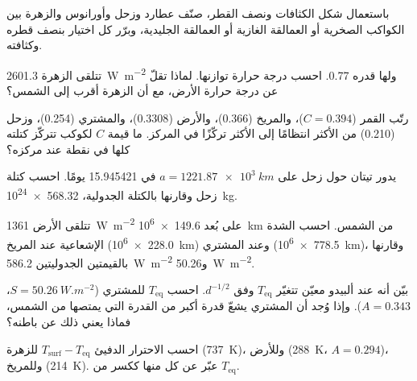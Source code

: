 \begin{exercise}[$\star$]\label{exo:b1:comparative-planetology:2}
باستعمال شكل الكثافات ونصف القطر، صنّف عطارد وزحل وأورانوس والزهرة بين الكواكب الصخرية أو العمالقة الغازية أو العمالقة الجليدية، وبرّر كل اختيار بنصف قطره وكثافته.
\end{exercise}

\begin{exercise}[$\star$]\label{exo:b1:comparative-planetology:3}
تتلقى الزهرة \qty{2601.3}{W.m^{-2}} ولها  قدره 0.77. احسب درجة حرارة توازنها. لماذا تقلّ عن درجة حرارة الأرض، مع أن الزهرة أقرب إلى الشمس؟
\end{exercise}

\begin{exercise}[$\star$]\label{exo:b1:comparative-planetology:4}
رتّب القمر ($C = 0.394$)، والمريخ (0.366)، والأرض (0.3308)، والمشتري (0.254)، وزحل (0.210) من الأكثر انتظامًا إلى الأكثر تركّزًا في المركز. ما قيمة $C$ لكوكب تتركّز كتلته كلها في نقطة عند مركزه؟
\end{exercise}

\begin{exercise}[$\star\star$]\label{exo:b1:comparative-planetology:5}
يدور تيتان حول زحل على $a = \qty{1221.87e3}{km}$ في \num{15.945421} يومًا. احسب كتلة زحل وقارنها بالكتلة الجدولية، \qty{568.32e24}{kg}.
\end{exercise}

\begin{exercise}[$\star\star$]\label{exo:b1:comparative-planetology:6}
تتلقى الأرض \qty{1361}{W.m^{-2}} على بُعد \qty{149.6e6}{km} من الشمس. احسب الشدة الإشعاعية عند المريخ (\qty{228.0e6}{km}) وعند المشتري (\qty{778.5e6}{km})، وقارنها بالقيمتين الجدوليتين \qty{586.2}{W.m^{-2}} و\qty{50.26}{W.m^{-2}}.
\end{exercise}

\begin{exercise}[$\star\star$]\label{exo:b1:comparative-planetology:7}
بيّن أنه عند ألبيدو معيّن تتغيّر $T_\mathrm{eq}$ وفق $d^{-1/2}$. احسب $T_\mathrm{eq}$ للمشتري ($S = \qty{50.26}{W.m^{-2}}$، $A = 0.343$). وإذا وُجد أن المشتري يشعّ قدرة أكبر من القدرة التي يمتصها من الشمس، فماذا يعني ذلك عن باطنه؟
\end{exercise}

\begin{exercise}[$\star\star$]\label{exo:b1:comparative-planetology:8}
احسب الاحترار الدفيئ $T_\mathrm{surf} - T_\mathrm{eq}$ للزهرة (\qty{737}{K})، وللأرض (\qty{288}{K}، $A = 0.294$)، وللمريخ (\qty{214}{K}). عبّر عن كل منها ككسر من $T_\mathrm{eq}$.
\end{exercise}

